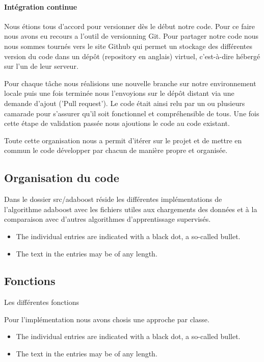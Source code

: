 \documentclass{article}
\begin{document}
\paragraph{Intégration continue}

Nous étions tous d'accord pour versionner dès le début notre code. Pour ce faire nous avons eu recours a l'outil de versionning Git. 
Pour partager notre code nous nous sommes tournés vers le site Github qui permet un stockage des différentes version du code dans un dépôt (repository en anglais) virtuel, c'est-à-dire hébergé sur l'un de leur serveur.

Pour chaque tâche nous réalisions une nouvelle branche sur notre environnement locale puis une fois terminée nous l'envoyions sur le dépôt distant via une demande d'ajout ('Pull request'). 
Le code était ainsi relu par un ou plusieurs camarade pour s'assurer qu'il soit fonctionnel et compréhensible de tous. Une fois cette étape de validation passée nous ajoutions le code au code existant. 

Toute cette organisation nous a permit d'itérer sur le projet et de mettre en commun le code développer par chacun de manière propre et organisée. 

\subsection{Organisation du code}

Dans le dossier src/adaboost réside les différentes implémentations de l'algorithme adaboost avec les fichiers utiles aux chargements des données et à la comparaison avec d'autres algorithmes d'apprentissage supervisés. 

\begin{itemize}
  \item The individual entries are indicated with a black dot, a so-called bullet.
  \item The text in the entries may be of any length.
\end{itemize}


\subsection{Fonctions}
Les différentes fonctions

Pour l'implémentation nous avons chosis une approche par classe.

\begin{itemize}
  \item The individual entries are indicated with a black dot, a so-called bullet.
  \item The text in the entries may be of any length.
\end{itemize}
\end{document}

